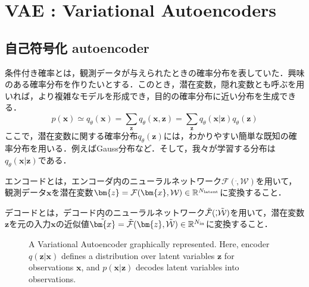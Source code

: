 \section{VAE : Variational Autoencoders}
\subsection{自己符号化 autoencoder}
条件付き確率とは，観測データが与えられたときの確率分布を表していた．興味のある確率分布を作りたいとする．このとき，潜在変数，隠れ変数とも呼ぶを用いれば，より複雑なモデルを形成でき，目的の確率分布に近い分布を生成できる． 
\begin{equation}
    p(\bm{x}) \simeq q_{\theta}(\bm{x})
    =\sum_{\bm{z}} q_{\theta}(\bm{x}, \bm{z})
    =\sum_{\bm{z}} q_{\theta}(\bm{x}|\bm{z})
    q_{\theta}(\bm{z})
\end{equation}
ここで，潜在変数に関する確率分布$q_{\theta}(\bm{z})$には，わかりやすい簡単な既知の確率分布を用いる．例えばGauss分布など．そして，我々が学習する分布は$q_{\theta}(\bm{x}|\bm{z})$である．

エンコードとは，エンコーダ内のニューラルネットワーク$\mathcal{F}(\dot,\mathcal{W})$を用いて，観測データ$\bm{x}$を潜在変数$\bm{z}=\mathcal{F}(\bm{x},\mathcal{W})\in\mathbb{R}^{N_{\rm{latent}}}$に変換すること．

デコードとは，デコード内のニューラルネットワーク$\Tilde{\mathcal{F}}(\dot,\Tilde{\mathcal{W}})$を用いて，潜在変数$\bm{z}$を元の入力$\bm{x}$の近似値$\Tilde{\bm{x}}=\Tilde{\mathcal{F}}(\bm{z},\Tilde{\mathcal{W}})\in\mathbb{R}^{N_{\rm{in}}}$に変換すること．
\begin{figure}
  \centering
  \caption{A Variational Autoencoder graphically represented.  Here, encoder $q(\bm{z}|\bm{x})$ defines a distribution over latent variables $\bm{z}$ for observations $\bm{x}$, and $p(\bm{x}|\bm{z})$ decodes latent variables into observations.}
  \label{fig:vae}
\end{figure}

